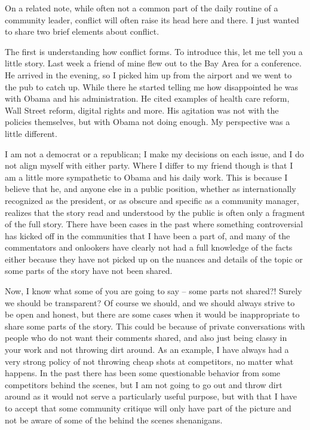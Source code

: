 On a related note, while often not a common part of the daily routine of a community leader, conflict will often raise its head here and there. I just wanted to share two brief elements about conflict.

The first is understanding how conflict forms. To introduce this, let me tell you a little story. Last week a friend of mine flew out to the Bay Area for a conference. He arrived in the evening, so I picked him up from the airport and we went to the pub to catch up. While there he started telling me how disappointed he was with Obama and his administration. He cited examples of health care reform, Wall Street reform, digital rights and more. His agitation was not with the policies themselves, but with Obama not doing enough. My perspective was a little different.

I am not a democrat or a republican; I make my decisions on each issue, and I do not align myself with either party. Where I differ to my friend though is that I am a little more sympathetic to Obama and his daily work. This is because I believe that he, and anyone else in a public position, whether as internationally recognized as the president, or as obscure and specific as a community manager, realizes that the story read and understood by the public is often only a fragment of the full story. There have been cases in the past where something controversial has kicked off in the communities that I have been a part of, and many of the commentators and onlookers have clearly not had a full knowledge of the facts either because they have not picked up on the nuances and details of the topic or some parts of the story have not been shared.

Now, I know what some of you are going to say -- some parts not shared?! Surely we should be transparent? Of course we should, and we should always strive to be open and honest, but there are some cases when it would be inappropriate to share some parts of the story. This could be because of private conversations with people who do not want their comments shared, and also just being classy in your work and not throwing dirt around. As an example, I have always had a very strong policy of not throwing cheap shots at competitors, no matter what happens. In the past there has been some questionable behavior from some competitors behind the scenes, but I am not going to go out and throw dirt around as it would not serve a particularly useful purpose, but with that I have to accept that some community critique will only have part of the picture and not be aware of some of the behind the scenes shenanigans.

